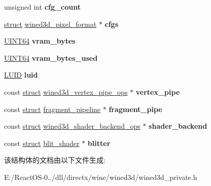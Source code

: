 \begin{DoxyCompactItemize}
\mbox{\label{structwined3d__adapter_aba8193bfd53fcb53d627a0ef3fe3e274}} 
unsigned int {\bfseries cfg\+\_\+count}
\item 
\mbox{\label{structwined3d__adapter_a1e3f577b93a87bde9f56bfd279ae7222}} 
\hyperlink{interfacestruct}{struct} \hyperlink{structwined3d__pixel__format}{wined3d\+\_\+pixel\+\_\+format} $\ast$ {\bfseries cfgs}
\item 
\mbox{\label{structwined3d__adapter_a0d9fc9eec82d406448f789cdc12b3677}} 
\hyperlink{_processor_bind_8h_a57be03562867144161c1bfee95ca8f7c}{U\+I\+N\+T64} {\bfseries vram\+\_\+bytes}
\item 
\mbox{\label{structwined3d__adapter_ac42d04131fbb743b66da9cb9ac9202f3}} 
\hyperlink{_processor_bind_8h_a57be03562867144161c1bfee95ca8f7c}{U\+I\+N\+T64} {\bfseries vram\+\_\+bytes\+\_\+used}
\item 
\mbox{\label{structwined3d__adapter_a74f7ffdde7d23693de098336de24db29}} 
\hyperlink{struct___l_u_i_d}{L\+U\+ID} {\bfseries luid}
\item 
\mbox{\label{structwined3d__adapter_ac3aa8499866e06bad8799e0044fcc8cd}} 
const \hyperlink{interfacestruct}{struct} \hyperlink{structwined3d__vertex__pipe__ops}{wined3d\+\_\+vertex\+\_\+pipe\+\_\+ops} $\ast$ {\bfseries vertex\+\_\+pipe}
\item 
\mbox{\label{structwined3d__adapter_a61983ab496703ad35bd0bccac0076438}} 
const \hyperlink{interfacestruct}{struct} \hyperlink{structfragment__pipeline}{fragment\+\_\+pipeline} $\ast$ {\bfseries fragment\+\_\+pipe}
\item 
\mbox{\label{structwined3d__adapter_a1957c21197b08c5b4faf764ce0992e46}} 
const \hyperlink{interfacestruct}{struct} \hyperlink{structwined3d__shader__backend__ops}{wined3d\+\_\+shader\+\_\+backend\+\_\+ops} $\ast$ {\bfseries shader\+\_\+backend}
\item 
\mbox{\label{structwined3d__adapter_af5722938988fb261f31b9411e0894233}} 
const \hyperlink{interfacestruct}{struct} \hyperlink{structblit__shader}{blit\+\_\+shader} $\ast$ {\bfseries blitter}
\end{DoxyCompactItemize}


该结构体的文档由以下文件生成\+:\begin{DoxyCompactItemize}
\item 
E\+:/\+React\+O\+S-\/0../dll/directx/wine/wined3d/wined3d\+\_\+private.\+h\end{DoxyCompactItemize}
